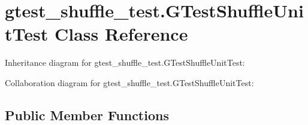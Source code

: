 \hypertarget{classgtest__shuffle__test_1_1_g_test_shuffle_unit_test}{}\section{gtest\+\_\+shuffle\+\_\+test.\+G\+Test\+Shuffle\+Unit\+Test Class Reference}
\label{classgtest__shuffle__test_1_1_g_test_shuffle_unit_test}


Inheritance diagram for gtest\+\_\+shuffle\+\_\+test.\+G\+Test\+Shuffle\+Unit\+Test\+:


Collaboration diagram for gtest\+\_\+shuffle\+\_\+test.\+G\+Test\+Shuffle\+Unit\+Test\+:
\subsection*{Public Member Functions}
